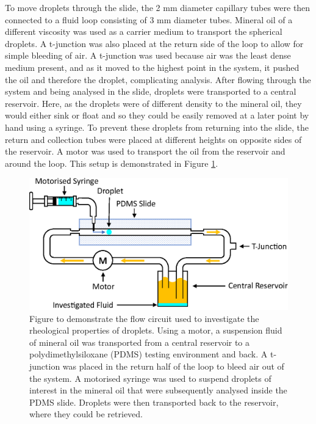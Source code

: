 \documentclass{physics_article_B}
\begin{document}
        To move droplets through the slide, the 2 mm diameter capillary tubes were then connected to a fluid loop consisting of 3 mm diameter tubes. Mineral oil of a different viscosity was used as a carrier medium to transport the spherical droplets. A t-junction was also placed at the return side of the loop to allow for simple bleeding of air. A t-junction was used because air was the least dense medium present, and as it moved to the highest point in the system, it pushed the oil and therefore the droplet, complicating analysis. After flowing through the system and being analysed in the slide, droplets were transported to a central reservoir. Here, as the droplets were of different density to the mineral oil, they would either sink or float and so they could be easily removed at a later point by hand using a syringe. To prevent these droplets from returning into the slide, the return and collection tubes were placed at different heights on opposite sides of the reservoir. A motor was used to transport the oil from the reservoir and around the loop. This setup is demonstrated in Figure \ref{fig:basic}.
        
            \begin{figure}[H]
                \centering                        
                    \hspace*{2.0cm}\includegraphics[scale=0.8]{Figures/Fluid.eps}
                    \caption{Figure to demonstrate the flow circuit used to investigate the rheological properties of droplets. Using a motor, a suspension fluid of mineral oil was transported from a central reservoir to a polydimethylsiloxane (PDMS) testing environment and back. A t-junction was placed in the return half of the loop to bleed air out of the system. A motorised syringe was used to suspend droplets of interest in the mineral oil that were subsequently analysed inside the PDMS slide. Droplets were then transported back to the reservoir, where they could be retrieved.}     
                \label{fig:basic}
            \end{figure} 
\end{document}
